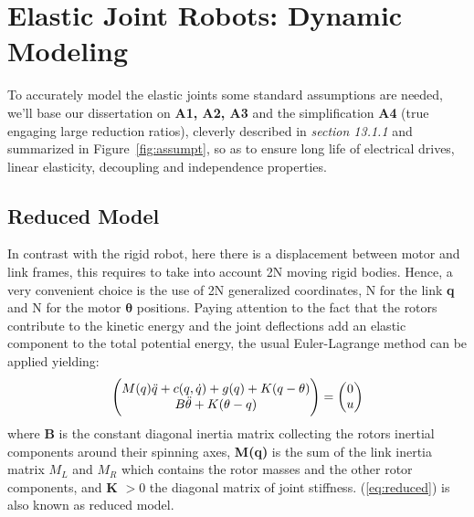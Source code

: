\section{Elastic Joint Robots: Dynamic Modeling}\label{sec:Dynamic Modeling}
To accurately model the elastic joints some standard assumptions are needed, we'll base our dissertation on \textbf{A1, A2, A3} and the simplification \textbf{A4} (true engaging large reduction ratios), cleverly 
described in \cite{13sic} \textit{section 13.1.1} and summarized in Figure~\ref{fig:assumpt}, so as to ensure long life of electrical drives, linear elasticity, decoupling and independence properties.
\subsection{Reduced Model}
In contrast with the rigid robot, here there is a displacement between motor and link frames, this requires to take into account 2N moving rigid bodies. Hence, a very convenient choice is the use of 2N generalized coordinates, N for the link \textbf{q} and N for the motor $\boldsymbol{\theta}$ positions. Paying attention to the fact that the rotors contribute to the kinetic energy and the joint deflections add an elastic component to the total potential energy, the usual Euler-Lagrange method can be applied 
yielding:
\begin{equation} \label{eq:reduced}
    \begin{pmatrix} 
    M(q)\Ddot{q}+c(q,\Dot{q})+g(q)+K(q-\theta)\\ B\Ddot{\theta}+K(\theta-q) 
    \end{pmatrix} 
    =
    \begin{pmatrix} 0 \\ u \end{pmatrix}
\end{equation}
where \textbf{B} is the constant diagonal inertia matrix collecting the rotors inertial components around their spinning axes, \textbf{M(q)} is the sum of the link inertia matrix $M_L$ and $M_R$ which contains the rotor masses and the other rotor components, and \textbf{K} $>0$ the diagonal matrix of joint stiffness. (\ref{eq:reduced}) is also known as reduced model.
